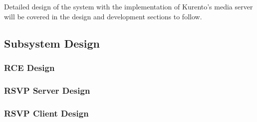       Detailed design of the system with the implementation of Kurento's media server will be covered in the design and development sections to follow.
  \subsection{Subsystem Design}
    \subsubsection{RCE Design}
      
    \subsubsection{RSVP Server Design}
    \label{subsubsec:rsvpServersPlan}
    \subsubsection{RSVP Client Design}
    
